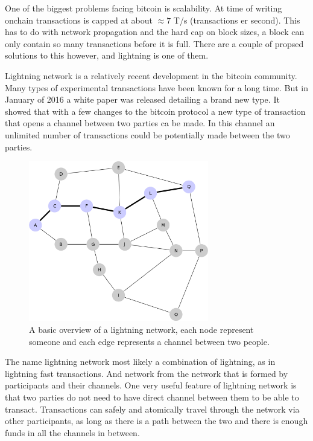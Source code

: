 
One of the biggest problems facing bitcoin is scalability. At time of writing onchain transactions is capped at about $\approx 7$ T/s (transactions er second).\cite{scaling} This has to do with network propagation and the hard cap on block sizes, a block can only contain so many transactions before it is full. There are a couple of propsed solutions to this however, and lightning is one of them. 

Lightning network is a relatively recent development in the bitcoin community. Many types of experimental transactions have been known for a long time. But in January of 2016 a white paper was released detailing a brand new type.\cite{lightningnetwork_2019} It showed that with a few changes to the bitcoin protocol a new type of transaction that opens a channel between two parties ca be made. In this channel an unlimited number of transactions could be potentially made between the two parties. \cite{lightningnetwork_2019}

\begin{figure}[H]
	\centering
	\includegraphics[width=0.70\textwidth]{introduction/images/mesh_network.png}
	\caption{A basic overview of a lightning network, each node represent someone and each edge represents a channel between two people.}
	\label{fig:blockchain3}
\end{figure}

The name lightning network most likely a combination of lightning, as in lightning fast transactions. And network from the network that is formed by participants and their channels. One very useful feature of lightning network is that two parties do not need to have direct channel between them to be able to transact. Transactions can safely and atomically travel through the network via other participants, as long as there is a path between the two and there is enough funds in all the channels in between.\cite{lightningnetwork_2019}